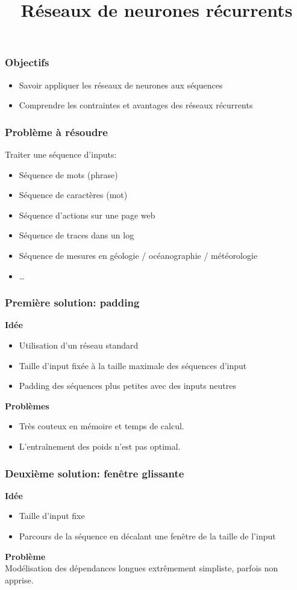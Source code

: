 \documentclass{formation}
\title{Réseaux de neurones récurrents}
\begin{document}
\maketitle

\begin{frame}
  \frametitle{Objectifs}
  \begin{itemize}
  \item Savoir appliquer les réseaux de neurones aux séquences
  \item Comprendre les contraintes et avantages des réseaux récurrents
  \end{itemize}
\end{frame}

\begin{frame}
  \frametitle{Problème à résoudre}
  Traiter une séquence d'inputs:
  \begin{itemize}
  \item Séquence de mots (phrase)
  \item Séquence de caractères (mot)
  \item Séquence d'actions sur une page web
  \item Séquence de traces dans un log
  \item Séquence de mesures en géologie / océanographie / météorologie
  \item …
  \end{itemize}
\end{frame}

\begin{frame}
  \frametitle{Première solution: padding}
  \textbf{Idée}
  \begin{itemize}
  \item Utilisation d'un réseau standard
  \item Taille d'input fixée à la taille maximale des séquences d'input
  \item Padding des séquences plus petites avec des inputs neutres
  \end{itemize}
  \textbf{Problèmes}
  \begin{itemize}
  \item Très couteux en mémoire et temps de calcul.
  \item L'entraînement des poids n'est pas optimal. \pause {}
  \end{itemize}
\end{frame}

\begin{frame}
  \frametitle{Deuxième solution: fenêtre glissante}
  \textbf{Idée}
  \begin{itemize}
  \item Taille d'input fixe
  \item Parcours de la séquence en décalant une fenêtre de la taille
    de l'input
  \end{itemize}
  
  \textbf{Problème}\\[.2cm]
  Modélisation des dépendances longues extrêmement simpliste, parfois
  non apprise. \pause \textbf{}
\end{frame}
\end{document}
